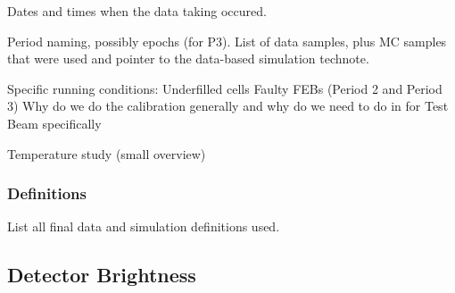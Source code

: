 \documentclass[12pt,a4paper]{article}
\begin{document}
Dates and times when the data taking occured.

Period naming, possibly epochs (for P3).
List of data samples, plus MC samples that were used and pointer to the data-based simulation technote.

Specific running conditions:
Underfilled cells
Faulty FEBs (Period 2 and Period 3)
Why do we do the calibration generally and why do we need to do in for Test Beam specifically

Temperature study (small overview)

\subsubsection{Definitions}
List all final data and simulation definitions used.

\subsection{Detector Brightness}
\end{document}
